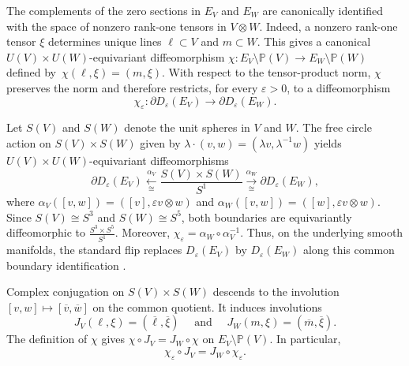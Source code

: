 \documentclass[10pt,a4paper]{amsart}
\numberwithin{equation}{section}
\renewcommand{\P}{\mathbb P}
\newcommand{\wideand}{ \quad \text{ and } \quad }
\begin{document}
The complements of the zero sections in $E_V$ and $E_W$ are canonically identified with the space of nonzero rank-one tensors in $V\otimes W$. 
Indeed, a nonzero rank-one tensor $\xi$ determines unique lines $\ell\subset V$ and $m\subset W$. 
This gives a canonical $U(V)\times U(W)$-equivariant diffeomorphism $\chi\colon E_V\setminus\P(V)\to E_W\setminus\P(W)$ defined by~$\chi(\ell,\xi)=(m,\xi)$.
With respect to the tensor-product norm, $\chi$ preserves the norm and therefore restricts, for every $\varepsilon>0$, to a diffeomorphism
$$
    \chi_\varepsilon\colon \partial D_\varepsilon(E_V)\longrightarrow \partial D_\varepsilon(E_W).
$$

Let $S(V)$ and $S(W)$ denote the unit spheres in $V$ and $W$. 
The free circle action on $S(V)\times S(W)$ given by $\lambda\cdot(v,w)=(\lambda v,\lambda^{-1}w)$ yields $U(V)\times U(W)$-equivariant diffeomorphisms
$$
    \partial D_\varepsilon(E_V) \xleftarrow[\cong]{\alpha_V} \frac{S(V)\times S(W)}{S^1} \xrightarrow[\cong]{\alpha_W}\partial D_\varepsilon(E_W),
$$
where $\alpha_V([v,w])=([v],\varepsilon v\otimes w)$ and $\alpha_W([v,w])=([w],\varepsilon v\otimes w)$.
Since $S(V)\cong S^3$ and $S(W)\cong S^5$, both boundaries are equivariantly diffeomorphic to $\frac{S^3\times S^5}{S^1}$. 
Moreover, $\chi_\varepsilon=\alpha_W\circ\alpha_V^{-1}$.
Thus, on the underlying smooth manifolds, the standard flip replaces $D_\varepsilon(E_V)$ by $D_\varepsilon(E_W)$ along this common boundary identification \cite[Section~3.1]{Fu-Hoskins-PLehalleur2023}.

Complex conjugation on $S(V)\times S(W)$ descends to the involution $[v,w]\mapsto[\overline v,\overline w]$ on the common quotient. 
It induces involutions
$$
    J_V(\ell,\xi)=(\overline{\ell},\overline{\xi}) \wideand J_W(m,\xi)=(\overline{m},\overline{\xi}).
$$
The definition of $\chi$ gives $\chi\circ J_V=J_W\circ\chi$ on $E_V\setminus\P(V)$. 
In particular,
\begin{equation}\label{eq:conjugation}
    \chi_\varepsilon\circ J_V=J_W\circ\chi_\varepsilon.
\end{equation}
\end{document}
